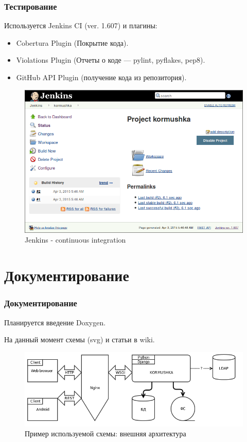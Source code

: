 \documentclass{beamer}
\newlength{\wideitemsep}
\let\olditem\item
\renewcommand{\item}{\setlength{\itemsep}{\wideitemsep}\olditem}
\begin{document}
\begin{frame}
\frametitle{Тестирование}

Используется Jenkins CI (ver. 1.607) и плагины:

\begin{itemize}
\item Cobertura Plugin (Покрытие кода).
\item Violations Plugin (Отчеты о коде — pylint, pyflakes, pep8).
\item GitHub API Plugin (получение кода из репозитория).
\end{itemize}


\begin{figure}
\includegraphics[scale=0.25]{res/r2_jenkins}
\caption{Jenkins - continuous integration}
\end{figure}

\end{frame}

\section{Документирование}

\begin{frame}
\frametitle{Документирование}

Планируется введение Doxygen.

На данный момент схемы (svg) и статьи в wiki.

\begin{figure}
\includegraphics[scale=0.60]{res/r2_kormushka_ext}
\caption{Пример используемой схемы: внешняя архитектура}
\end{figure}


\end{frame}
\end{document}
